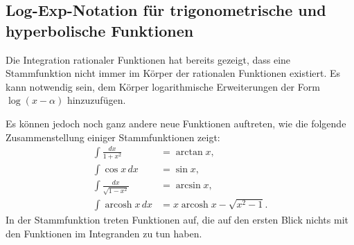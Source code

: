 %
%
%
\subsection{Log-Exp-Notation für trigonometrische und hyperbolische Funktionen
\label{buch:integral:subsection:logexp}}
Die Integration rationaler Funktionen hat bereits gezeigt, dass
eine Stammfunktion nicht immer im Körper der rationalen Funktionen
existiert.
Es kann notwendig sein, dem Körper logarithmische Erweiterungen der Form
$\log(x-\alpha)$ hinzuzufügen.

Es können jedoch noch ganz andere neue Funktionen auftreten, wie die
folgende Zusammenstellung einiger Stammfunktionen zeigt:
\begin{equation}
\begin{aligned}
\int\frac{dx}{1+x^2}
&=
\arctan x,
\\
\int \cos x\,dx
&=
\sin x,
\\
\int\frac{dx}{\sqrt{1-x^2}}
&=
\arcsin x,
\\
\int
\operatorname{arcosh} x\,dx
&=
x \operatorname{arcosh} x - \sqrt{x^2-1}.
\end{aligned}
\label{buch:integration:risch:allgform}
\end{equation}
In der Stammfunktion treten Funktionen auf, die auf den ersten
Blick nichts mit den Funktionen im Integranden zu tun haben.


